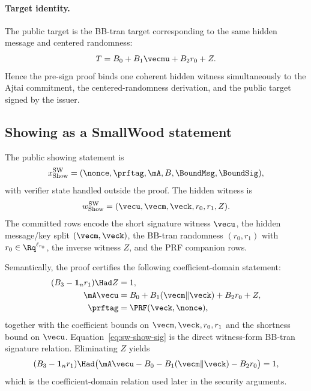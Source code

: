 \paragraph{Target identity.}
The public target is the BB-tran target corresponding to the same hidden message and centered randomness:
\[
  T=B_0+B_1\vecmu+B_2r_0+Z.
\]
Hence the pre-sign proof binds one coherent hidden witness simultaneously to the Ajtai commitment, the
centered-randomness derivation, and the public target signed by the issuer.

\subsection{Showing as a SmallWood statement}
\label{subsec:smallwood-showing}
\label{subsec:showing-compiled}
The public showing statement is
\[
  x^{\mathrm{SW}}_{\mathrm{Show}}=(\nonce,\prftag,\mA,B,\BoundMsg,\BoundSig),
\]
with verifier state handled outside the proof.  The hidden witness is
\[
  w^{\mathrm{SW}}_{\mathrm{Show}}=(\vecu,\vecm,\veck,r_0,r_1,Z).
\]
The committed rows encode the short signature witness $\vecu$, the hidden message/key split $(\vecm,\veck)$,
the BB-tran randomness $(r_0,r_1)$ with $r_0\in\Rq^{\ell_{r_0}}$, the inverse witness $Z$, and the PRF companion rows.

Semantically, the proof certifies the following coefficient-domain statement:
\begin{align}
  (B_3-\mathbf 1_n r_1)\Had Z&=1, \label{eq:sw-show-inv}\\
  \mA\vecu&=B_0+B_1(\vecm\Vert\veck)+B_2r_0+Z, \label{eq:sw-show-sig}\\
  \prftag&=\PRF(\veck,\nonce), \label{eq:sw-show-prf}
\end{align}
together with the coefficient bounds on $\vecm,\veck,r_0,r_1$ and the shortness bound on $\vecu$.
Equation~\eqref{eq:sw-show-sig} is the direct witness-form BB-tran signature relation.  Eliminating $Z$ yields
\begin{equation}
  (B_3-\mathbf 1_n r_1)\Had\bigl(\mA\vecu-B_0-B_1(\vecm\Vert\veck)-B_2r_0\bigr)=1,
  \label{eq:sw-show-eliminated}
\end{equation}
which is the coefficient-domain relation used later in the security arguments.


